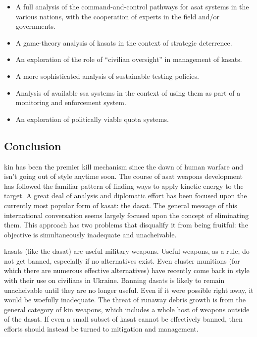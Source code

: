 \begin{itemize}

\item A full analysis of the command-and-control pathways for asat
  systems in the various nations, with the cooperation of experts in
  the field and/or governments.

\item A game-theory analysis of \acp{kasat} in the context of
  strategic deterrence.

\item An exploration of the role of ``civilian oversight'' in
  management of \acp{kasat}.

\item A more sophisticated analysis of sustainable testing policies.

\item Analysis of available \ac{ssa} systems in the context of using
  them as part of a monitoring and enforcement system.

\item An exploration of politically viable quota systems.

\end{itemize}


\subsection{Conclusion}

\ac{kin} has been the premier kill mechanism since the dawn of human
warfare and isn't going out of style anytime soon.  The course of
\ac{asat} weapons development has followed the familiar pattern of
finding ways to apply kinetic energy to the target.  A great deal of
analysis and diplomatic effort has been focused upon the currently
most popular form of \ac{kasat}: the \acf{dasat}.  The general message
of this international conversation seems largely focused upon the
concept of eliminating them.  This approach has two problems that
disqualify it from being fruitful: the objective is simultaneously
inadequate and unacheivable.

\acp{kasat} (like the \ac{dasat}) are useful military weapons.  Useful
weapons, as a rule, do not get banned, especially if no alternatives
exist.  Even cluster munitions (for which there are numerous effective
alternatives) have recently come back in style with their use on
civilians in Ukraine.  Banning \acp{dasat} is likely to remain
unacheivable until they are no longer useful.  Even if it were
possible right away, it would be woefully inadequate.  The threat of
runaway debris growth is from the general category of \ac{kin}
weapons, which includes a whole host of weapons outside of the
\ac{dasat}.  If even a small subset of \ac{kasat} cannot be
effectively banned, then efforts should instead be turned to
mitigation and management.

